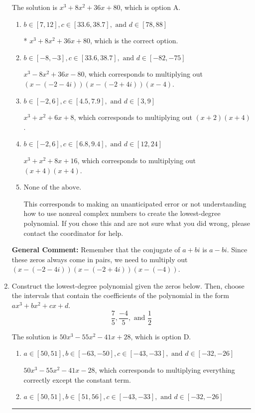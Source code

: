 \documentclass{extbook}[14pt]
\newcommand{\litem}[1]{\item #1

\rule{\textwidth}{0.4pt}}
\begin{document}
\begin{enumerate}
{The solution is \( x^{3} +8 x^{2} +36 x + 80 \), which is option A.\begin{enumerate}[label=\Alph*.]
\item \( b \in [7, 12], c \in [33.6, 38.7], \text{ and } d \in [78, 88] \)

* $x^{3} +8 x^{2} +36 x + 80$, which is the correct option.
\item \( b \in [-8, -3], c \in [33.6, 38.7], \text{ and } d \in [-82, -75] \)

$x^{3} -8 x^{2} +36 x -80$, which corresponds to multiplying out $(x-(-2 - 4 i))(x-(-2 + 4 i))(x -4)$.
\item \( b \in [-2, 6], c \in [4.5, 7.9], \text{ and } d \in [3, 9] \)

$x^{3} + x^{2} +6 x + 8$, which corresponds to multiplying out $(x + 2)(x + 4)$.
\item \( b \in [-2, 6], c \in [6.8, 9.4], \text{ and } d \in [12, 24] \)

$x^{3} + x^{2} +8 x + 16$, which corresponds to multiplying out $(x + 4)(x + 4)$.
\item \( \text{None of the above.} \)

This corresponds to making an unanticipated error or not understanding how to use nonreal complex numbers to create the lowest-degree polynomial. If you chose this and are not sure what you did wrong, please contact the coordinator for help.
\end{enumerate}

\textbf{General Comment:} Remember that the conjugate of $a+bi$ is $a-bi$. Since these zeros always come in pairs, we need to multiply out $(x-(-2 - 4 i))(x-(-2 + 4 i))(x-(-4))$.
}
\litem{
Construct the lowest-degree polynomial given the zeros below. Then, choose the intervals that contain the coefficients of the polynomial in the form $ax^3+bx^2+cx+d$.
\[ \frac{7}{5}, \frac{-4}{5}, \text{ and } \frac{1}{2} \]

The solution is \( 50x^{3} -55 x^{2} -41 x + 28 \), which is option D.\begin{enumerate}[label=\Alph*.]
\item \( a \in [50, 51], b \in [-63, -50], c \in [-43, -33], \text{ and } d \in [-32, -26] \)

$50x^{3} -55 x^{2} -41 x -28$, which corresponds to multiplying everything correctly except the constant term.
\item \( a \in [50, 51], b \in [51, 56], c \in [-43, -33], \text{ and } d \in [-32, -26] \)


\end{enumerate}}
\end{enumerate}
\end{document}
